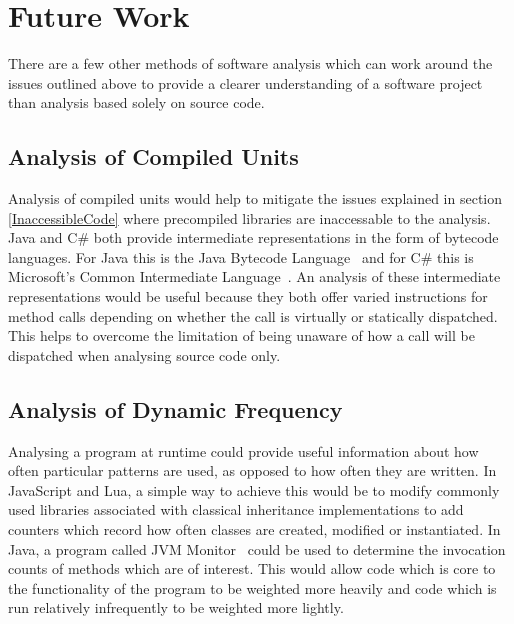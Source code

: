\section{Future Work}
There are a few other methods of software analysis which can work around the issues outlined above to provide a clearer understanding of a software project than analysis based solely on source code.

\subsection{Analysis of Compiled Units}
Analysis of compiled units would help to mitigate the issues explained in section \ref{InaccessibleCode} where precompiled libraries are inaccessable to the analysis. Java and C\# both provide intermediate representations in the form of bytecode languages. For Java this is the Java Bytecode Language~\cite{JVMSpec} and for C\# this is Microsoft's Common Intermediate Language~\cite{CommonIntermediateLanguage}. An analysis of these intermediate representations would be useful because they both offer varied instructions for method calls depending on whether the call is virtually or statically dispatched. This helps to overcome the limitation of being unaware of how a call will be dispatched when analysing source code only.

\subsection{Analysis of Dynamic Frequency}
Analysing a program at runtime could provide useful information about how often particular patterns are used, as opposed to how often they are written. In JavaScript and Lua, a simple way to achieve this would be to modify commonly used libraries associated with classical inheritance implementations to add counters which record how often classes are created, modified or instantiated. In Java, a program called JVM Monitor~\cite{JVMMonitor} could be used to determine the invocation counts of methods which are of interest. This would allow code which is core to the functionality of the program to be weighted more heavily and code which is run relatively infrequently to be weighted more lightly.

